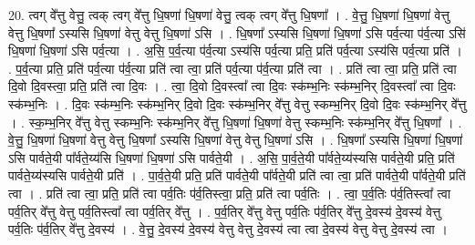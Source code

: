 \documentclass[17pt]{extarticle}
\begin{document}
20. त्वग् वे᳚त्तु वेत्तु॒ त्वक् त्वग् वे᳚त्तु धि॒षणा॑ धि॒षणा॑ वेत्तु॒ त्वक् त्वग् वे᳚त्तु धि॒षणा᳚ । . वे॒त्तु॒ धि॒षणा॑ धि॒षणा॑ वेत्तु वेत्तु धि॒षणा᳚ ऽस्यसि धि॒षणा॑ वेत्तु वेत्तु धि॒षणा॑ ऽसि । . धि॒षणा᳚ ऽस्यसि धि॒षणा॑ धि॒षणा॑ ऽसि पर्व॒त्या प॑र्व॒त्या ऽसि॑ धि॒षणा॑ धि॒षणा॑ ऽसि पर्व॒त्या । . अ॒सि॒ प॒र्व॒त्या प॑र्व॒त्या ऽस्य॑सि पर्व॒त्या प्रति॒ प्रति॑ पर्व॒त्या ऽस्य॑सि पर्व॒त्या प्रति॑ । . प॒र्व॒त्या प्रति॒ प्रति॑ पर्व॒त्या प॑र्व॒त्या प्रति॑ त्वा त्वा॒ प्रति॑ पर्व॒त्या प॑र्व॒त्या प्रति॑ त्वा । . प्रति॑ त्वा त्वा॒ प्रति॒ प्रति॑ त्वा दि॒वो दि॒वस्त्वा॒ प्रति॒ प्रति॑ त्वा दि॒वः । . त्वा॒ दि॒वो दि॒वस्त्वा᳚ त्वा दि॒वः स्क॑म्भ॒निः स्क॑म्भ॒निर् दि॒वस्त्वा᳚ त्वा दि॒वः स्क॑म्भ॒निः । . दि॒वः स्क॑म्भ॒निः स्क॑म्भ॒निर् दि॒वो दि॒वः स्क॑म्भ॒निर् वे᳚त्तु वेत्तु स्कम्भ॒निर् दि॒वो दि॒वः स्क॑म्भ॒निर् वे᳚त्तु । . स्क॒म्भ॒निर् वे᳚त्तु वेत्तु स्कम्भ॒निः स्क॑म्भ॒निर् वे᳚त्तु धि॒षणा॑ धि॒षणा॑ वेत्तु स्कम्भ॒निः स्क॑म्भ॒निर् वे᳚त्तु धि॒षणा᳚ । . वे॒त्तु॒ धि॒षणा॑ धि॒षणा॑ वेत्तु वेत्तु धि॒षणा᳚ ऽस्यसि धि॒षणा॑ वेत्तु वेत्तु धि॒षणा॑ ऽसि । . धि॒षणा᳚ ऽस्यसि धि॒षणा॑ धि॒षणा॑ ऽसि पार्वते॒यी पा᳚र्वते॒य्य॑सि धि॒षणा॑ धि॒षणा॑ ऽसि पार्वते॒यी । . अ॒सि॒ पा॒र्व॒ते॒यी पा᳚र्वते॒य्य॑स्यसि पार्वते॒यी प्रति॒ प्रति॑ पार्वते॒य्य॑स्यसि पार्वते॒यी प्रति॑ । . पा॒र्व॒ते॒यी प्रति॒ प्रति॑ पार्वते॒यी पा᳚र्वते॒यी प्रति॑ त्वा त्वा॒ प्रति॑ पार्वते॒यी पा᳚र्वते॒यी प्रति॑ त्वा । . प्रति॑ त्वा त्वा॒ प्रति॒ प्रति॑ त्वा पर्व॒तिः प॑र्व॒तिस्त्वा॒ प्रति॒ प्रति॑ त्वा पर्व॒तिः । . त्वा॒ प॒र्व॒तिः प॑र्व॒तिस्त्वा᳚ त्वा पर्व॒तिर् वे᳚त्तु वेत्तु पर्व॒तिस्त्वा᳚ त्वा पर्व॒तिर् वे᳚त्तु । . प॒र्व॒तिर् वे᳚त्तु वेत्तु पर्व॒तिः प॑र्व॒तिर् वे᳚त्तु दे॒वस्य॑ दे॒वस्य॑ वेत्तु पर्व॒तिः प॑र्व॒तिर् वे᳚त्तु दे॒वस्य॑ । . वे॒त्तु॒ दे॒वस्य॑ दे॒वस्य॑ वेत्तु वेत्तु दे॒वस्य॑ त्वा त्वा दे॒वस्य॑ वेत्तु वेत्तु दे॒वस्य॑ त्वा । \newline
\end{document}
